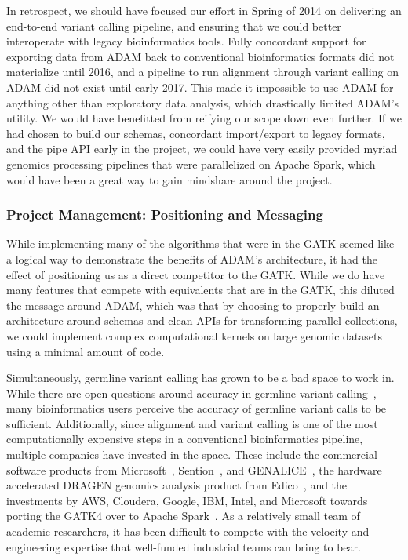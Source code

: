 \documentclass[phd]{ucbthesis}
\begin{document}
In retrospect, we should have focused our effort in Spring of 2014 on delivering
an end-to-end variant calling pipeline, and ensuring that we could better
interoperate with legacy bioinformatics tools. Fully concordant support for
exporting data from ADAM back to conventional bioinformatics formats did not
materialize until 2016, and a pipeline to run alignment through variant calling
on ADAM did not exist until early 2017. This made it impossible to use ADAM for
anything other than exploratory data analysis, which drastically limited ADAM's
utility. We would have benefitted from reifying our scope down even further. If
we had chosen to build our schemas, concordant import/export to legacy formats,
and the pipe API early in the project, we could have very easily provided
myriad genomics processing pipelines that were parallelized on Apache Spark,
which would have been a great way to gain mindshare around the project.

\subsubsection{Project Management: Positioning and Messaging}
\label{sec:fail-positioning}

While implementing many of the algorithms that were in the GATK seemed like a
logical way to demonstrate the benefits of ADAM's architecture, it had the
effect of positioning us as a direct competitor to the GATK. While we do
have many features that compete with equivalents that are in the GATK, this
diluted the message around ADAM, which was that by choosing to properly build
an architecture around schemas and clean APIs for transforming parallel
collections, we could implement complex computational kernels on large genomic
datasets using a minimal amount of code.

Simultaneously, germline variant calling has grown to be a bad space to work
in. While there are open questions around accuracy in germline variant
calling~\cite{li14}, many bioinformatics users perceive the accuracy of germline
variant calls to be sufficient. Additionally, since alignment and variant
calling is one of the most computationally expensive steps in a conventional
bioinformatics pipeline, multiple companies have invested in the space. These
include the commercial software products from Microsoft~\cite{msr16},
Sention~\cite{freed17}, and GENALICE~\cite{pluss17}, the hardware accelerated
DRAGEN genomics analysis product from Edico~\cite{dragen}, and the investments
by AWS, Cloudera, Google, IBM, Intel, and Microsoft towards porting the GATK4
over to Apache Spark~\cite{broad16}. As a relatively small team of academic
researchers, it has been difficult to compete with the velocity and engineering
expertise that well-funded industrial teams can bring to bear.
\end{document}
